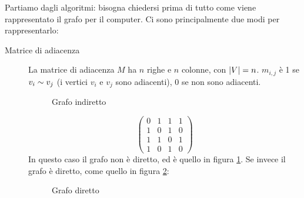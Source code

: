 Partiamo dagli algoritmi: bisogna chiedersi prima di tutto come viene rappresentato il grafo per il computer. Ci sono principalmente due modi per rappresentarlo:
\begin{description}
    \item[Matrice di adiacenza] La matrice di adiacenza $M$ ha $n$ righe e $n$ colonne, con $\left\lvert{V}\right\rvert = n$. $m_{i,j}$ \`e 1 se $v_i \sim v_j$ (i vertici $v_i$ e $v_j$ sono adiacenti), 0 se non sono adiacenti.
    \begin{figure}[h]
    \centering
    \caption{\label{fig:matrice_grafo_indiretto}Grafo indiretto}
    \end{figure}
    \[
    \begin{pmatrix}
    0 & 1 & 1 & 1 \\
    1 & 0 & 1 & 0 \\
    1 & 1 & 0 & 1 \\
    1 & 0 & 1 & 0
    \end{pmatrix}
    \]
    In questo caso il grafo non \`e diretto, ed \`e quello in figura \ref{fig:matrice_grafo_indiretto}. Se invece il grafo \`e diretto, come quello in figura \ref{fig:matrice_grafo_diretto}:
    \begin{figure}[h]
    \centering
    \caption{\label{fig:matrice_grafo_diretto}Grafo diretto}
\end{figure}
\end{description}
